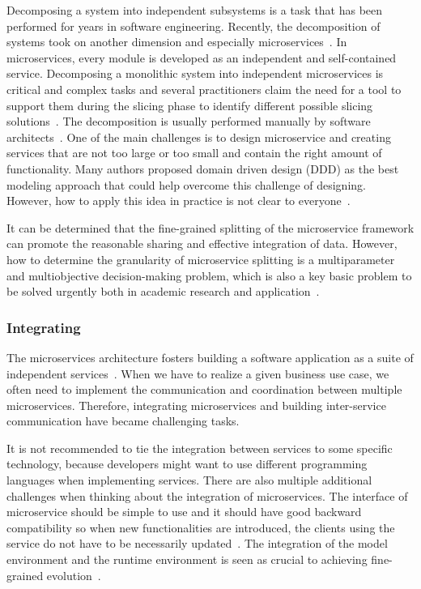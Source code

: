 Decomposing a system into independent subsystems is a task that has been performed for years in software engineering. Recently, the decomposition of systems took on another dimension and especially microservices~\cite{Fred2015, Netflix}. In microservices, every module is developed as an independent and self-contained service. Decomposing a monolithic system into independent microservices is critical and complex tasks and several practitioners claim the need for a tool to support them during the slicing phase to identify different possible slicing solutions~\cite{Taibi2019}. The decomposition is usually performed manually by software architects~\cite{Zhang2019, Carvalho2019}. 
One of the main challenges is to design microservice and creating services that are not too large or too small and contain the right amount of functionality. Many authors proposed domain driven design (DDD) as the best modeling approach that could help overcome this challenge of designing. However, how to apply this idea in practice is not clear to everyone~\cite{Merson2020}.

It can be determined that the fine-grained splitting of the microservice framework can promote the reasonable sharing and effective integration of data. However, how to determine the granularity of microservice splitting is a multiparameter and multiobjective decision-making problem, which is also a key basic problem to be solved urgently both in academic research and application~\cite{Yan2020}.


\subsubsection{Integrating}%

The microservices architecture fosters building a software application as a suite of independent services~\cite{rosa2018}. When we have to realize a given business use case, we often need to implement the communication and coordination between multiple microservices. Therefore, integrating microservices and building inter-service communication have became challenging tasks. 

\par It is not recommended to tie the integration between services to some specific technology, because developers might want to use different programming languages when implementing services. 
There are also multiple additional challenges when thinking about the integration of microservices. The interface of microservice should be simple to use and it should have good backward compatibility so when new functionalities are introduced, the clients using the service do not have to be necessarily updated~\cite{liu2018, Zhang2019, Kalske2017paper}. The integration of the model environment and the runtime environment is seen as crucial to achieving fine-grained evolution~\cite{overeem2018}.




